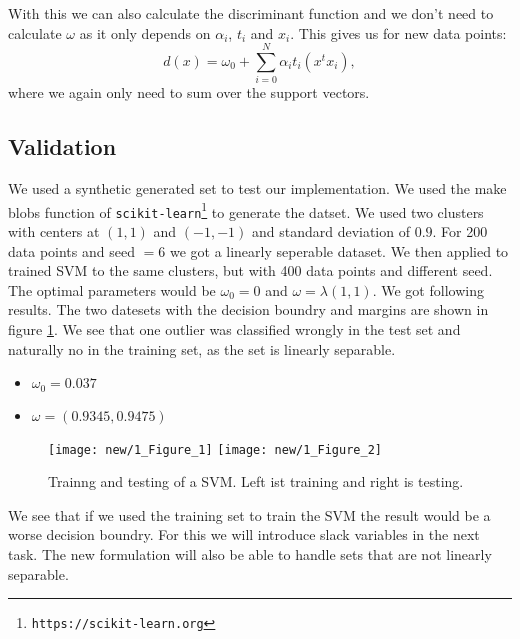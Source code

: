 With this we can also calculate the discriminant function and we don't need to calculate $\omega$ as it only depends on $\alpha_i$, $t_i$ and $x_i$. This gives us for new data points:
\[
	d(x) = \omega_0 + \sum_{i=0}^N\alpha_it_i(x^tx_i),
\]
where we again only need to sum over the support vectors.
\subsection{Validation}

We used a synthetic generated set to test our implementation. We used the make blobs function of \texttt{scikit-learn\footnote{https://scikit-learn.org}} to generate the datset. We used two clusters with centers at $(1,1)$ and $(-1,-1)$ and standard deviation of $0.9$. For 200 data points and seed $=6$ we got a linearly seperable dataset. We then applied to trained SVM to the same clusters, but with 400 data points and different seed. The optimal parameters would be $\omega_0 = 0$ and $\omega = \lambda (1,1)$. We got following results. The two datesets with the decision boundry and margins are shown in figure \ref{task1::svm}. We see that one outlier was classified wrongly in the test set and naturally no in the training set, as the set is linearly separable.
\begin{itemize}
	\item $\omega_0 = 0.037$
	\item $\omega = (0.9345, 0.9475)$
\end{itemize}
\begin{figure}
	\texttt{[image: new/1\_Figure\_1]}
	\texttt{[image: new/1\_Figure\_2]}
	\caption{Trainng and testing of a SVM. Left ist training and right is testing.}
	\label{task1::svm}
\end{figure}

We see that if we used the training set to train the SVM the result would be a worse decision boundry. For this we will introduce slack variables in the next task. The new formulation will also be able to handle sets that are not linearly separable.
